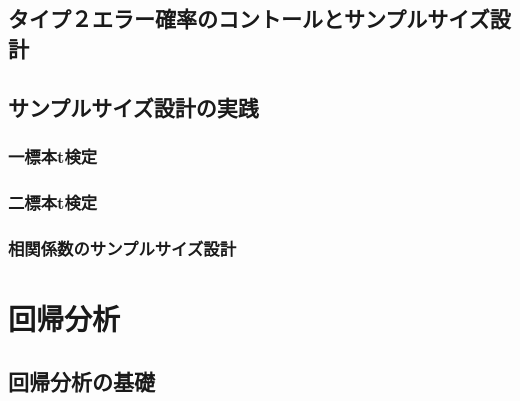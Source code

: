 \documentclass[
  a4paper,
]{ltjsbook}
\begin{document}
\hypertarget{ux30bfux30a4ux30d7uxff12ux30a8ux30e9ux30fcux78baux7387ux306eux30b3ux30f3ux30c8ux30fcux30ebux3068ux30b5ux30f3ux30d7ux30ebux30b5ux30a4ux30baux8a2dux8a08}{%
\section{タイプ２エラー確率のコントールとサンプルサイズ設計}\label{ux30bfux30a4ux30d7uxff12ux30a8ux30e9ux30fcux78baux7387ux306eux30b3ux30f3ux30c8ux30fcux30ebux3068ux30b5ux30f3ux30d7ux30ebux30b5ux30a4ux30baux8a2dux8a08}}

\hypertarget{ux30b5ux30f3ux30d7ux30ebux30b5ux30a4ux30baux8a2dux8a08ux306eux5b9fux8df5}{%
\section{サンプルサイズ設計の実践}\label{ux30b5ux30f3ux30d7ux30ebux30b5ux30a4ux30baux8a2dux8a08ux306eux5b9fux8df5}}

\hypertarget{ux4e00ux6a19ux672ctux691cux5b9a}{%
\subsection{一標本t検定}\label{ux4e00ux6a19ux672ctux691cux5b9a}}

\hypertarget{ux4e8cux6a19ux672ctux691cux5b9a}{%
\subsection{二標本t検定}\label{ux4e8cux6a19ux672ctux691cux5b9a}}

\hypertarget{ux76f8ux95a2ux4fc2ux6570ux306eux30b5ux30f3ux30d7ux30ebux30b5ux30a4ux30baux8a2dux8a08}{%
\subsection{相関係数のサンプルサイズ設計}\label{ux76f8ux95a2ux4fc2ux6570ux306eux30b5ux30f3ux30d7ux30ebux30b5ux30a4ux30baux8a2dux8a08}}


\hypertarget{ux56deux5e30ux5206ux6790}{%
\chapter{回帰分析}\label{ux56deux5e30ux5206ux6790}}

\hypertarget{ux56deux5e30ux5206ux6790ux306eux57faux790e}{%
\section{回帰分析の基礎}\label{ux56deux5e30ux5206ux6790ux306eux57faux790e}}
\end{document}

